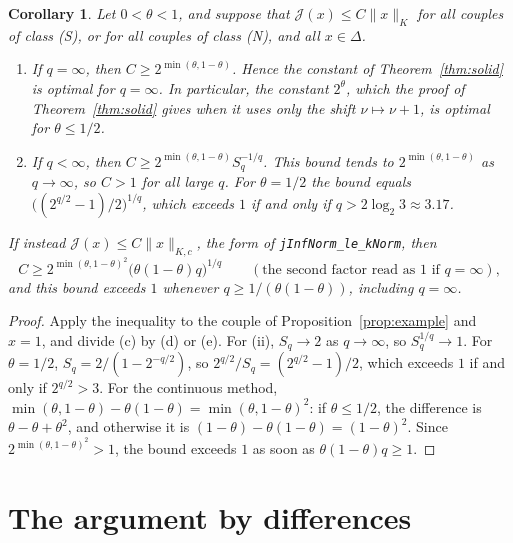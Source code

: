 \documentclass[11pt]{article}
\newtheorem{corollary}[theorem]{Corollary}
\theoremstyle{remark}
\newcommand{\norm}[2]{\lVert #1\rVert_{#2}}
\newcommand{\cJ}{\mathcal J}
\begin{document}
\begin{corollary}\label{cor:sharp}
  Let \(0 < \theta < 1\), and suppose that \(\cJ(x) \le C\norm{x}{K}\) for all couples of
  class (S), or for all couples of class (N), and all \(x \in \Delta\).
  \begin{enumerate}
    \item[(i)] If \(q = \infty\), then \(C \ge 2^{\min(\theta,1-\theta)}\). Hence the constant of
      Theorem~\ref{thm:solid} is optimal for \(q = \infty\). In particular, the constant
      \(2^\theta\), which the proof of Theorem~\ref{thm:solid} gives when it uses only the
      shift \(\nu \mapsto \nu + 1\), is optimal for \(\theta \le 1/2\).
    \item[(ii)] If \(q < \infty\), then \(C \ge 2^{\min(\theta,1-\theta)} S_q^{-1/q}\). This
      bound tends to \(2^{\min(\theta,1-\theta)}\) as \(q \to \infty\), so \(C > 1\) for all
      large \(q\). For \(\theta = 1/2\) the bound equals \(\bigl((2^{q/2} - 1)/2\bigr)^{1/q}\),
      which exceeds \(1\) if and only if \(q > 2\log_2 3 \approx 3.17\).
  \end{enumerate}
  If instead \(\cJ(x) \le C\norm{x}{K,c}\), the form of \texttt{jInfNorm\_le\_kNorm}, then
  \[
    C \ge 2^{\min(\theta,1-\theta)^2}\bigl(\theta(1-\theta)q\bigr)^{1/q}
    \qquad (\text{the second factor read as } 1 \text{ if } q = \infty),
  \]
  and this bound exceeds \(1\) whenever \(q \ge 1/(\theta(1-\theta))\), including
  \(q = \infty\).
\end{corollary}

\begin{proof}
  Apply the inequality to the couple of Proposition~\ref{prop:example} and \(x = 1\), and
  divide (c) by (d) or (e). For (ii), \(S_q \to 2\) as \(q \to \infty\), so
  \(S_q^{1/q} \to 1\). For \(\theta = 1/2\), \(S_q = 2/(1 - 2^{-q/2})\), so
  \(2^{q/2}/S_q = (2^{q/2} - 1)/2\), which exceeds \(1\) if and only if \(2^{q/2} > 3\). For
  the continuous method,
  \(\min(\theta,1-\theta) - \theta(1-\theta) = \min(\theta,1-\theta)^2\): if
  \(\theta \le 1/2\), the difference is \(\theta - \theta + \theta^2\), and otherwise it is
  \((1-\theta) - \theta(1-\theta) = (1-\theta)^2\). Since \(2^{\min(\theta,1-\theta)^2} > 1\),
  the bound exceeds \(1\) as soon as \(\theta(1-\theta)q \ge 1\).
\end{proof}

\section{The argument by differences}
\end{document}
